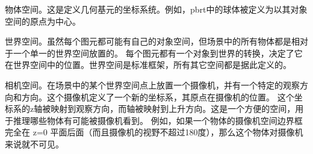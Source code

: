 物体空间。这是定义几何基元的坐标系统。例如，pbrt中的球体被定义为以其对象空间的原点为中心。

世界空间。虽然每个图元都可能有自己的对象空间，但场景中的所有物体都是相对于一个单一的世界空间放置的。
每个图元都有一个对象到世界的转换，决定了它在世界空间中的位置。世界空间是标准框架，所有其它空间都是据此定义的。

相机空间。在场景中的某个世界空间点上放置一个摄像机，并有一个特定的观察方向和方向。这个摄像机定义了一个新的坐标系，其原点在摄像机的位置。
这个坐标系的z轴被映射到观察方向，而轴被映射到上升方向。这是一个方便的空间，用于推理哪些物体有可能被摄像机看到。
例如，如果一个物体的摄像机空间边界框完全在 z=0 平面后面（而且摄像机的视野不超过180度），那么这个物体对摄像机来说就不可见。